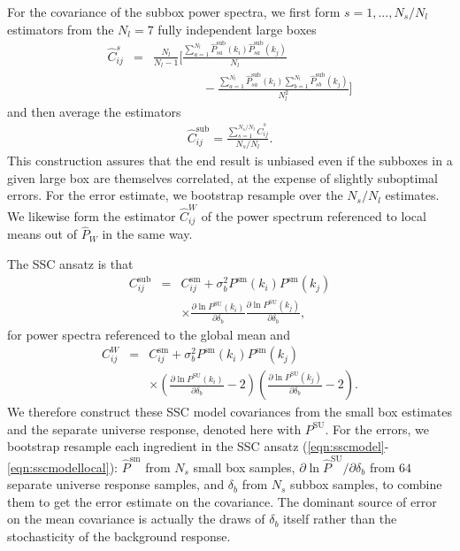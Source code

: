 \documentclass[prd,twocolumn,amsmath,amssymb,floatfix,superscriptaddress]{revtex4-1}
\begin{document}
For the covariance of the subbox power spectra, we first form $s=1,...,N_s/N_l$ estimators from the $N_l=7$  fully independent large boxes
\begin{eqnarray}
\hat C_{ij}^s &=& \frac{N_l}{N_l-1} \Bigg[ \frac{\sum_{a=1}^{N_l} \hat P_{s a}^\text{sub}(k_i)
\hat P_{s a}^\text{sub}(k_j)}{N_l}\\&&
\hspace{4em}
 -  \frac{\sum_{a=1}^{N_l} 
\hat P_{s a}^\text{sub}(k_i) \sum_{b=1}^{N_l} \hat P_{s b}^\text{sub}(k_j)  } {N_l^2}  \Bigg]\nonumber
\end{eqnarray}
and then average the estimators
\begin{eqnarray}
\hat C_{ij}^\text{sub} = \frac{\sum_{s=1}^{N_s/N_l} \hat C_{ij}^s}{N_s/N_l}.
\end{eqnarray}
This construction assures that the end result is unbiased even if the subboxes in a 
given large box are themselves correlated, at the expense of slightly suboptimal errors.
For the error estimate, we bootstrap resample over the $N_s/N_l$ estimates.
We likewise form the estimator $\hat C_{ij}^W$ of the power spectrum referenced to
local means  out of $\hat P_W$ in the same way. 




The SSC ansatz is that 
\begin{eqnarray}
\label{eqn:sscmodel}
C_{ij}^{\text{sub}} &=&
 C_{ij}^{\text{sm}} +  \sigma_b^2 P^\text{sm}(k_i) P^\text{sm}(k_j) \\
&& \times
    \frac{\partial\ln P^\text{SU}(k_i)}{\partial\delta_b} \frac{\partial\ln P^\text{SU}(k_j)}{\partial\delta_b}, \nonumber
\end{eqnarray}
for power spectra referenced to the global mean and
\begin{eqnarray}
\label{eqn:sscmodellocal}
C_{ij}^{W} &=&
 C_{ij}^{\text{sm}} +  \sigma_b^2 P^\text{sm}(k_i) P^\text{sm}(k_j) \\
&& \times \left(
    \frac{\partial\ln P^\text{SU}(k_i)}{\partial\delta_b}-2\right) \left( \frac{\partial\ln P^\text{SU}(k_j)}{\partial\delta_b}-2\right).\nonumber
\end{eqnarray}
We therefore construct these SSC model covariances from the small box estimates
and the separate universe response, denoted here with $P^\text{SU}$.
For the errors, we 
 bootstrap resample each
ingredient in the SSC ansatz (\ref{eqn:sscmodel}-\ref{eqn:sscmodellocal}):
$\hat P^\text{sm}$ from $N_s$ small box samples, $\partial \ln \hat P^\text{SU}/\partial \delta_b$
from $64$ separate universe response samples, and $\delta_b$ from $N_s$ subbox samples,
to combine them to get the error estimate on the covariance.
The dominant source of error on the mean
covariance is actually the draws of $\delta_b$ itself rather than the stochasticity of
the background response.
\end{document}
